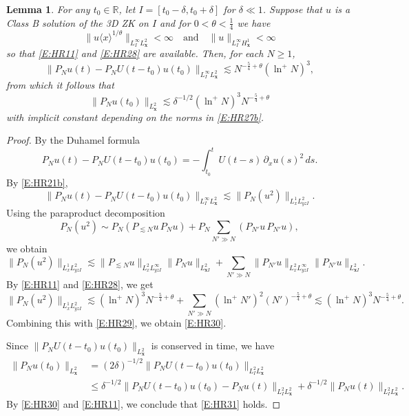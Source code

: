 \documentclass[12pt,letterpaper]{amsart}
\newcommand{\la}{\langle}
\newcommand{\ra}{\rangle}
\newtheorem{lemma}[theorem]{Lemma}
\theoremstyle{remark}
\numberwithin{equation}{section}
\numberwithin{theorem}{section}
\numberwithin{table}{section}
\begin{document}
\begin{lemma}
\label{L:reg-boost-last}
For any $t_0\in \mathbb{R}$, let $I=[t_0-\delta,t_0+\delta]$ for  $\delta \ll 1$.  Suppose that $u$ is a Class B solution of the 3D ZK on $I$ and for $0<\theta<\frac14$ we have
\begin{equation}
\label{E:HR27b}
\| u\la x \ra^{1/\theta} \|_{L_I^\infty L_{\mathbf{x}}^2} <\infty \quad \mbox{and} \quad \|u \|_{L_I^\infty H_{\mathbf{x}}^1} < \infty
\end{equation}
so that \eqref{E:HR11} and \eqref{E:HR28} are available.
Then, for each $N\geq 1$,
\begin{equation}
\label{E:HR30}
\|P_N u(t) -P_NU(t-t_0) u(t_0) \|_{L_I^\infty L_{\mathbf{x}}^2} \lesssim N^{-\frac54+\theta} (\ln^+ N)^3,
\end{equation}
from which it follows that
\begin{equation}
\label{E:HR31}
\|P_N u(t_0) \|_{L_{\mathbf{x}}^2} \lesssim \delta^{-1/2} (\ln^+ N)^3 N^{-\frac54+\theta}
\end{equation}
with implicit constant depending on the norms in \eqref{E:HR27b}.  
\end{lemma}

\begin{proof}
By the Duhamel formula
$$
P_Nu(t)-P_NU(t-t_0) u(t_0) = -\int_{t_0}^t U(t-s) \, \partial_x u(s)^2 \, ds.
$$
By \eqref{E:HR21b},
\begin{equation}
\label{E:HR29}
\| P_Nu(t)-P_NU(t-t_0) u(t_0)\|_{L_I^\infty L_{\mathbf{x}}^2} \lesssim \| P_N(u^2) \|_{L_x^1L_{yz I}^2}.
\end{equation}
Using the paraproduct decomposition
$$
P_N ( u^2) \sim P_N (P_{\lesssim N} u \, P_N u) + P_N \sum_{N'\gg N} (P_{N'}u \, P_{N'}u),
$$
we obtain
$$
\| P_N (u^2) \|_{L_x^1 L_{yzI}^2} \lesssim \| P_{\lesssim N} u \|_{L_x^2L_{yzI}^\infty} \|P_N u \|_{L_{\mathbf{x}I}^2} + \sum_{N'\gg N} \| P_{N'} u \|_{L_x^2L_{yzI}^\infty} \|P_{N'} u \|_{L_{\mathbf{x}I}^2}.
$$
By \eqref{E:HR11} and \eqref{E:HR28}, we get
$$
\| P_N (u^2) \|_{L_x^1 L_{yzI}^2} \lesssim (\ln^+ N)^3 N^{-\frac54+\theta} + \sum_{N'\gg N} (\ln^+ N')^2 (N')^{-\frac54+\theta} \lesssim (\ln^+ N)^3 N^{-\frac54+\theta}.
$$
Combining this with \eqref{E:HR29}, we obtain \eqref{E:HR30}.

Since $\| P_N U(t-t_0) u(t_0)\|_{L_{\mathbf{x}}^2}$ is conserved in time, we have
\begin{align*}
\|P_N u(t_0) \|_{L_{\mathbf{x}}^2} &= (2\delta)^{-1/2} \|P_N U(t-t_0) u(t_0) \|_{L_I^2 L_{\mathbf{x}}^2} \\
&\leq \delta^{-1/2} \|P_N U(t-t_0) u(t_0)- P_N u(t) \|_{L_I^2 L_{\mathbf{x}}^2} + \delta^{-1/2} \|P_N u(t) \|_{L_I^2 L_{\mathbf{x}}^2}.
\end{align*}
By \eqref{E:HR30} and \eqref{E:HR11}, we conclude that \eqref{E:HR31} holds.
\end{proof}
\end{document}
